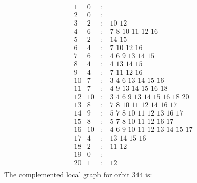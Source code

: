 \documentclass[12pt]{article}
\begin{document}
\begin{equation*}
\begin{array}{rrcl}
1&0&:&\\
2&0&:&\\
3&2&:&\,\,10\,\,12\\
4&6&:&\,\,7\,\,8\,\,10\,\,11\,\,12\,\,16\\
5&2&:&\,\,14\,\,15\\
6&4&:&\,\,7\,\,10\,\,12\,\,16\\
7&6&:&\,\,4\,\,6\,\,9\,\,13\,\,14\,\,15\\
8&4&:&\,\,4\,\,13\,\,14\,\,15\\
9&4&:&\,\,7\,\,11\,\,12\,\,16\\
10&7&:&\,\,3\,\,4\,\,6\,\,13\,\,14\,\,15\,\,16\\
11&7&:&\,\,4\,\,9\,\,13\,\,14\,\,15\,\,16\,\,18\\
12&10&:&\,\,3\,\,4\,\,6\,\,9\,\,13\,\,14\,\,15\,\,16\,\,18\,\,20\\
13&8&:&\,\,7\,\,8\,\,10\,\,11\,\,12\,\,14\,\,16\,\,17\\
14&9&:&\,\,5\,\,7\,\,8\,\,10\,\,11\,\,12\,\,13\,\,16\,\,17\\
15&8&:&\,\,5\,\,7\,\,8\,\,10\,\,11\,\,12\,\,16\,\,17\\
16&10&:&\,\,4\,\,6\,\,9\,\,10\,\,11\,\,12\,\,13\,\,14\,\,15\,\,17\\
17&4&:&\,\,13\,\,14\,\,15\,\,16\\
18&2&:&\,\,11\,\,12\\
19&0&:&\\
20&1&:&\,\,12\\
\end{array}
\end{equation*}
The complemented local graph for orbit $344$ is:
\end{document}

